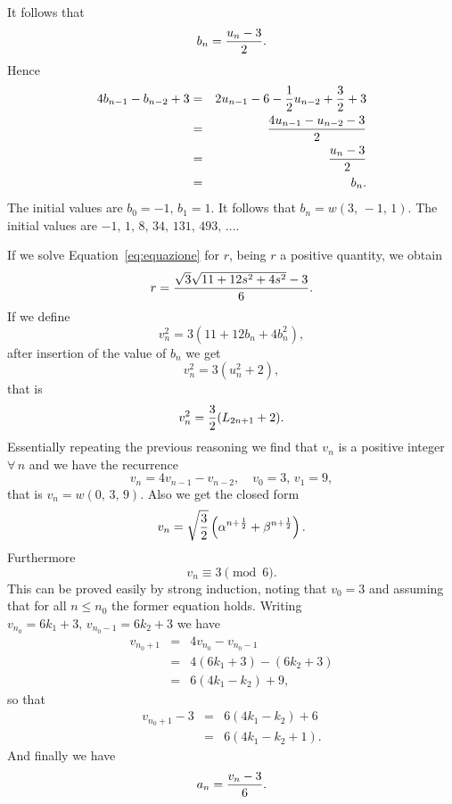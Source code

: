 \noindent
It follows that
$$b_n={u_n-3\over 2}.$$
Hence
\begin{eqnarray*}
4b_{n-1}-b_{n-2}+3&=&2u_{n-1}-6-{1\over 2}u_{n-2}+{3\over 2}+3\\
&=&{4u_{n-1}-u_{n-2}-3\over 2}\\
&=&{u_n-3\over 2}\\
&=&b_n.
\end{eqnarray*}
The initial values are $b_0=-1,\,b_1=1$.
It follows that $b_n=w(3,\,-1,\,1)$.
The initial values are
$-1,\,1,\,8,\,34,\,131,\,493,\,\ldots$.


\noindent
If we solve Equation~\ref{eq:equazione} for $r$, being $r$ a positive
quantity, we obtain
$$r={\sqrt{3}\sqrt{11+12s^2+4s^2}-3\over 6}.$$
If we define
$$v_n^2=3(11+12b_n+4b_n^2),$$
after insertion of the value of $b_n$ we get
$$v_n^2=3(u_n^2+2),$$
that is
$$v_n^2={3\over 2}(L_{2n+1}+2).$$
Essentially repeating the previous reasoning
we find that $v_n$ is a positive integer $\forall\, n$ and we have
the recurrence
$$v_n=4v_{n-1}-v_{n-2},\quad v_0=3,\,v_1=9,$$
that is $v_n=w(0,\,3,\,9)$. Also we get the closed form
$$v_n=\sqrt{{3\over 2}}\left (\alpha^{n+{1\over 2}}+\beta^{n+{1\over 2}}
\right ).$$
Furthermore
$$v_n\equiv 3\pmod{6}.$$
This can be proved easily by strong induction, noting that $v_0=3$ and
assuming that for all $n\le n_0$ the former equation holds.
Writing $v_{n_0}=6k_1+3,\,v_{n_0-1}=6k_2+3$ we have
\begin{eqnarray*}
v_{n_0+1}&=&4v_{n_0}-v_{n_0-1}\\
&=&4(6k_1+3)-(6k_2+3)\\
&=&6(4k_1-k_2)+9,
\end{eqnarray*}
so that
\begin{eqnarray*}
v_{n_0+1}-3&=&6(4k_1-k_2)+6\\
&=&6(4k_1-k_2+1).
\end{eqnarray*}
And finally we have
$$a_n={v_n-3\over 6}.$$


